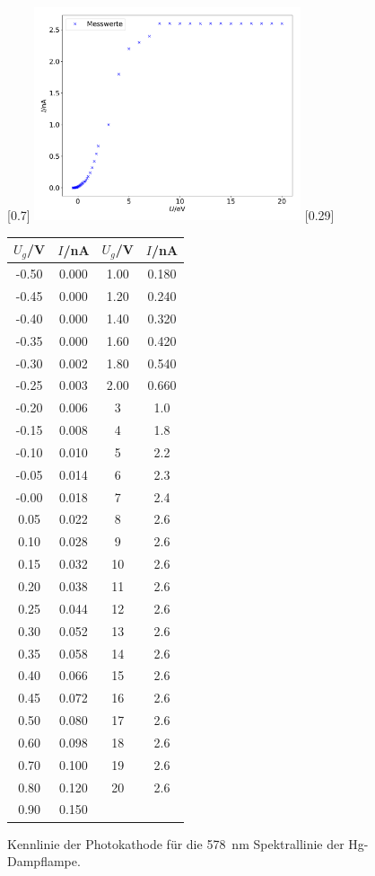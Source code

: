 \begin{figure}[p]
  \centering
  [0.7\textwidth]{
    \includegraphics[width=0.7\textwidth]{Kennlinie.pdf}
    }
  \hfill
  [0.29\textwidth]{
    \begin{tabular}{c c | c c}
      \toprule
      $U_g$/\si{\volt} & $I$/\si{\nano\ampere} & $U_g$/\si{\volt} & $I$/\si{\nano\ampere}\\
      \midrule
      -0.50 & 0.000 & 1.00 & 0.180 \\
      -0.45 & 0.000 & 1.20 & 0.240 \\
      -0.40 & 0.000 & 1.40 & 0.320 \\
      -0.35 & 0.000 & 1.60 & 0.420 \\
      -0.30 & 0.002 & 1.80 & 0.540 \\
      -0.25 & 0.003 & 2.00 & 0.660 \\
      -0.20 & 0.006 & 3 & 1.0 \\
      -0.15 & 0.008 & 4 & 1.8 \\
      -0.10 & 0.010 & 5 & 2.2 \\
      -0.05 & 0.014 & 6 & 2.3 \\
      -0.00 & 0.018 & 7 & 2.4 \\
      0.05 & 0.022 & 8 & 2.6 \\
      0.10 & 0.028 & 9 & 2.6 \\
      0.15 & 0.032 & 10 & 2.6 \\
      0.20 & 0.038 & 11 & 2.6 \\
      0.25 & 0.044 & 12 & 2.6 \\
      0.30 & 0.052 & 13 & 2.6 \\
      0.35 & 0.058 & 14 & 2.6 \\
      0.40 & 0.066 & 15 & 2.6 \\
      0.45 & 0.072 & 16 & 2.6 \\
      0.50 & 0.080 & 17 & 2.6 \\
      0.60 & 0.098 & 18 & 2.6 \\
      0.70 & 0.100 & 19 & 2.6 \\
      0.80 & 0.120 & 20 & 2.6 \\
      0.90 & 0.150 &    &     \\
      \bottomrule
    \end{tabular}
    }
  \hfill
  \caption{Kennlinie der Photokathode für die \SI{578}{\nano\metre} Spektrallinie der
  Hg-Dampflampe.}
\end{figure}
